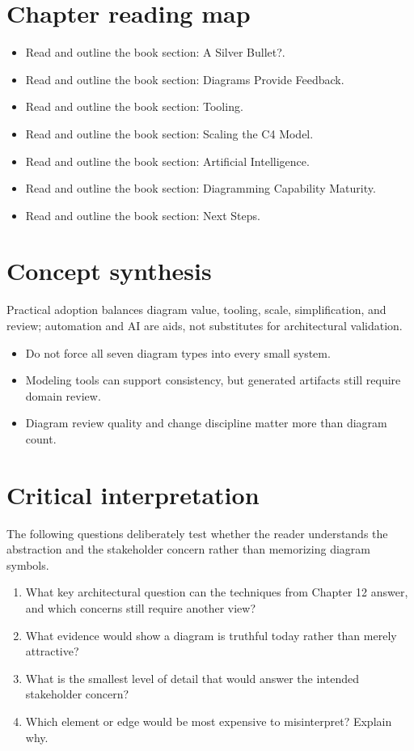 \documentclass[10pt,letterpaper]{article}
\begin{document}
\section{Chapter reading map}
\begin{itemize}
\item Read and outline the book section: A Silver Bullet?.
\item Read and outline the book section: Diagrams Provide Feedback.
\item Read and outline the book section: Tooling.
\item Read and outline the book section: Scaling the C4 Model.
\item Read and outline the book section: Artificial Intelligence.
\item Read and outline the book section: Diagramming Capability Maturity.
\item Read and outline the book section: Next Steps.
\end{itemize}

\section{Concept synthesis}
Practical adoption balances diagram value, tooling, scale, simplification, and review; automation and AI are aids, not substitutes for architectural validation.

\begin{itemize}
\item Do not force all seven diagram types into every small system.
\item Modeling tools can support consistency, but generated artifacts still require domain review.
\item Diagram review quality and change discipline matter more than diagram count.
\end{itemize}

\section{Critical interpretation}
The following questions deliberately test whether the reader understands the abstraction and the stakeholder concern rather than memorizing diagram symbols.

\begin{enumerate}
\item What key architectural question can the techniques from Chapter 12 answer, and which concerns still require another view?
\item What evidence would show a diagram is truthful today rather than merely attractive?
\item What is the smallest level of detail that would answer the intended stakeholder concern?
\item Which element or edge would be most expensive to misinterpret? Explain why.
\end{enumerate}
\end{document}
